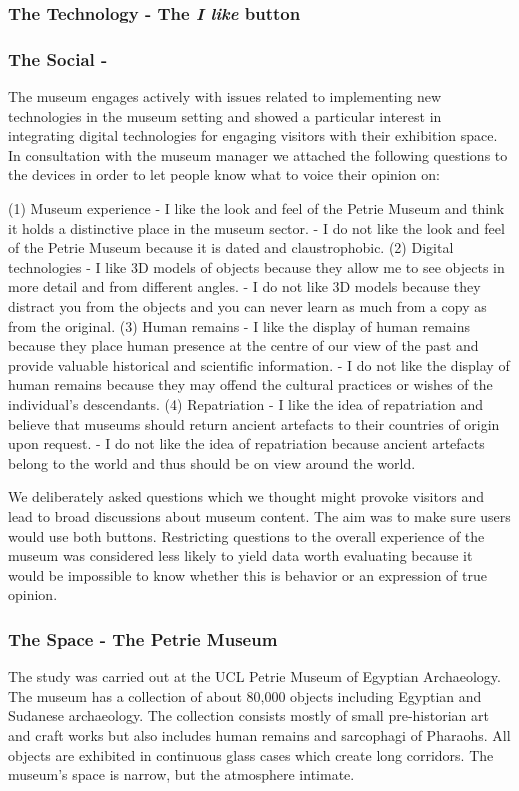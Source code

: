 \subsubsection{The Technology - The \textit{I like} button}



\subsubsection{The Social -  }

The museum engages actively with issues related to implementing new technologies in the museum setting and showed a particular interest in integrating digital technologies for engaging visitors with their exhibition space.
In consultation with the museum manager we attached the following questions to the devices in order to let people know what to voice their opinion on:

(1) Museum experience
- I like the look and feel of the Petrie Museum and think it holds a distinctive place in the museum sector. - I do not like the look and feel of the Petrie Museum because it is dated and claustrophobic.
(2) Digital technologies
- I like 3D models of objects because they allow me to see objects in more detail and from different angles. - I do not like 3D models because they distract you from the objects and you can never learn as much from a copy as from the original.
(3) Human remains
- I like the display of human remains because they place human presence at the centre of our view of the past and provide valuable historical and scientific information. - I do not like the display of human remains because they may offend the cultural practices or wishes of the individual's descendants.
(4) Repatriation
- I like the idea of repatriation and believe that museums should return ancient artefacts to their countries of origin upon request. - I do not like the idea of repatriation because ancient artefacts belong to the world and thus should be on view around the world.

We deliberately asked questions which we thought might provoke visitors and lead to broad discussions about museum content. The aim was to make sure users would use both buttons. Restricting questions to the overall experience of the museum was considered less likely to yield data worth evaluating because it would be impossible to know whether this is behavior or an expression of true opinion.

\subsubsection{The Space - The Petrie Museum}
The study was carried out at the UCL Petrie Museum of Egyptian Archaeology. The museum has a collection of about 80,000 objects including Egyptian and Sudanese archaeology. The collection consists mostly of small pre-historian art and craft works but also includes human remains and sarcophagi of Pharaohs. All objects are exhibited in continuous glass cases which create long corridors. The museum’s space is narrow, but the atmosphere intimate. 

